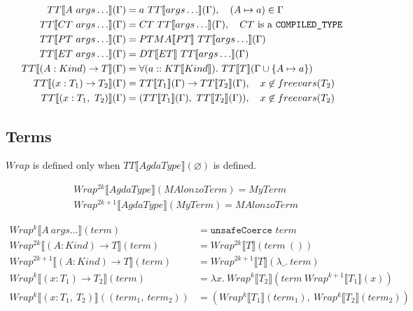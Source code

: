 \begin{align*}
   TT\llbracket A\ args\ldots \rrbracket(\Gamma) &= a\ TT\llbracket args\ldots \rrbracket(\Gamma),
      \quad (A \mapsto a) \in \Gamma \\
   TT\llbracket CT\ args\ldots \rrbracket(\Gamma) &= CT\ TT\llbracket args\ldots \rrbracket(\Gamma),
      \quad CT\text{ is a \texttt{COMPILED\_TYPE}}\\
   TT\llbracket PT\ args\ldots \rrbracket(\Gamma) &= PTMA\llbracket PT \rrbracket\ TT\llbracket args\ldots \rrbracket(\Gamma) \\
   TT\llbracket ET\ args\ldots \rrbracket(\Gamma) &= DT\llbracket ET \rrbracket \ TT\llbracket args\ldots \rrbracket(\Gamma)\\
   TT\llbracket (A : Kind) \rightarrow T \rrbracket(\Gamma) &= \forall (a :: KT\llbracket Kind \rrbracket).
      \ TT\llbracket T \rrbracket(\Gamma \cup \{A \mapsto a\})\\
   TT\llbracket (x : T_1) \rightarrow T_2 \rrbracket(\Gamma) &=
      TT\llbracket T_1 \rrbracket(\Gamma) \rightarrow TT\llbracket T_2 \rrbracket(\Gamma),
      \quad x \not\in freevars(T_2) \\
   TT\llbracket (x : T_1,\ T_2) \rrbracket(\Gamma) &=
      (TT\llbracket T_1 \rrbracket(\Gamma),\ TT\llbracket T_2 \rrbracket(\Gamma)),
      \quad x \not\in freevars(T_2) \\
\end{align*}

\subsection{Terms}

\(Wrap\) is defined only when \(TT\llbracket AgdaType \rrbracket(\varnothing)\) is defined.

\begin{align*}
   &Wrap^{2k}\llbracket AgdaType \rrbracket(MAlonzoTerm) = MyTerm\\
   &Wrap^{2k + 1}\llbracket AgdaType \rrbracket(MyTerm) = MAlonzoTerm
\end{align*}

\begin{align*}
   Wrap^k\llbracket A\ args\ldots \rrbracket(term) &= \texttt{unsafeCoerce } term\\
   Wrap^{2k}\llbracket (A : Kind) \rightarrow T \rrbracket(term) &= Wrap^{2k}\llbracket T \rrbracket(term\ ())\\
   Wrap^{2k+1}\llbracket (A : Kind) \rightarrow T \rrbracket(term) &= Wrap^{2k+1}\llbracket T \rrbracket(\lambda \_.\ term)\\
   Wrap^k\llbracket (x : T_1) \rightarrow T_2 \rrbracket(term) &=
      \lambda x.\ Wrap^k\llbracket T_2 \rrbracket(term\ Wrap^{k+1}\llbracket T_1 \rrbracket(x))\\
   Wrap^k\llbracket (x : T_1,\ T_2) \rrbracket((term_1,\ term_2)) &=
      (Wrap^k\llbracket T_1 \rrbracket(term_1),\ Wrap^k\llbracket T_2 \rrbracket(term_2))
\end{align*}

